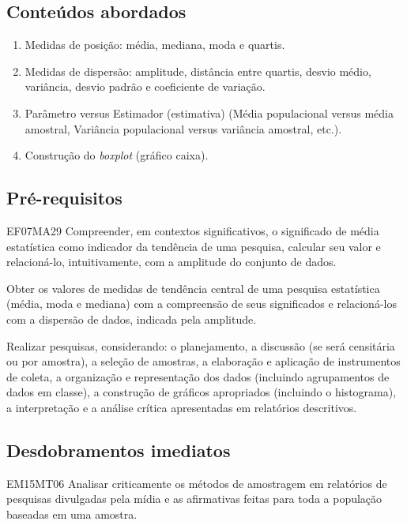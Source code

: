 \begin{apresentacao}
\subsection{Conteúdos abordados}

\begin{enumerate}
\item Medidas de posição: média, mediana, moda e quartis.
\item Medidas de dispersão: amplitude, distância entre quartis, desvio médio, variância, desvio padrão e coeficiente de variação.
\item Parâmetro versus Estimador (estimativa) (Média populacional versus média amostral, Variância populacional versus variância amostral, etc.).
\item Construção do \textit{boxplot} (gráfico caixa).
\end{enumerate}

\subsection{Pré-requisitos}

\begin{habilities}{EF07MA29} Compreender, em contextos significativos, o significado de média estatística como indicador da tendência de uma pesquisa, calcular seu valor e relacioná-lo, intuitivamente, com a amplitude do conjunto de dados.

 Obter os valores de medidas de tendência central de uma pesquisa estatística (média, moda e mediana) com a compreensão de seus significados e relacioná-los com a dispersão de dados, indicada pela amplitude.

 Realizar pesquisas, considerando: o planejamento, a discussão (se será censitária ou por amostra), a seleção de amostras, a elaboração e aplicação de instrumentos de coleta, a organização e representação dos dados (incluindo agrupamentos de dados em classe), a construção de gráficos apropriados (incluindo o histograma), a interpretação e a análise crítica apresentadas em relatórios descritivos.
\end{habilities}

\subsection{Desdobramentos imediatos}

\begin{habilities}{EM15MT06} Analisar criticamente os métodos de amostragem em relatórios de pesquisas divulgadas pela mídia e as afirmativas feitas para toda a população baseadas em uma amostra.
\end{habilities}
\clearpage


\end{apresentacao}
